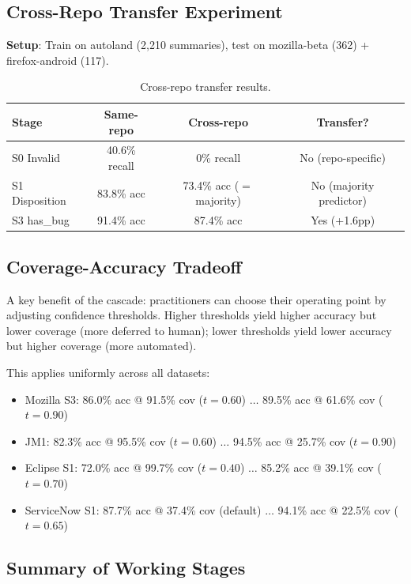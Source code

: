 \documentclass[11pt]{article}
\begin{document}
\subsection{Cross-Repo Transfer Experiment}

\textbf{Setup}: Train on autoland (2,210 summaries), test on mozilla-beta (362) + firefox-android (117).

\begin{table}[h]
\centering
\caption{Cross-repo transfer results.}
\label{tab:cross-repo}
\begin{tabular}{lccc}
\toprule
\textbf{Stage} & \textbf{Same-repo} & \textbf{Cross-repo} & \textbf{Transfer?} \\
\midrule
S0 Invalid & 40.6\% recall & 0\% recall & No (repo-specific) \\
S1 Disposition & 83.8\% acc & 73.4\% acc ($=$majority) & No (majority predictor) \\
S3 has\_bug & 91.4\% acc & 87.4\% acc & Yes (+1.6pp) \\
\bottomrule
\end{tabular}
\end{table}

\subsection{Coverage-Accuracy Tradeoff}

A key benefit of the cascade: practitioners can choose their operating point by adjusting confidence thresholds. Higher thresholds yield higher accuracy but lower coverage (more deferred to human); lower thresholds yield lower accuracy but higher coverage (more automated).

This applies uniformly across all datasets:
\begin{itemize}
    \item Mozilla S3: 86.0\% acc @ 91.5\% cov ($t=0.60$) $\ldots$ 89.5\% acc @ 61.6\% cov ($t=0.90$)
    \item JM1: 82.3\% acc @ 95.5\% cov ($t=0.60$) $\ldots$ 94.5\% acc @ 25.7\% cov ($t=0.90$)
    \item Eclipse S1: 72.0\% acc @ 99.7\% cov ($t=0.40$) $\ldots$ 85.2\% acc @ 39.1\% cov ($t=0.70$)
    \item ServiceNow S1: 87.7\% acc @ 37.4\% cov (default) $\ldots$ 94.1\% acc @ 22.5\% cov ($t=0.65$)
\end{itemize}

\subsection{Summary of Working Stages}
\end{document}
